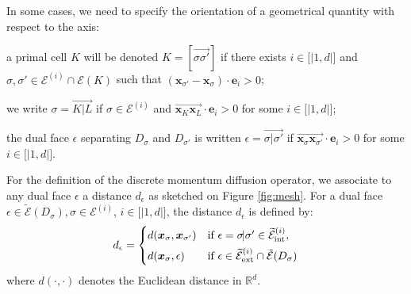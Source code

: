 \documentclass{amsart}
\numberwithin{equation}{section}
\begin{document}
\medskip
In some cases, we need to specify the orientation of a geometrical quantity with respect to the axis:
\begin{list}{-}{\itemsep=0.ex \topsep=0.5ex    }
\item a primal cell $K$ will be denoted $K = [\overrightarrow{{{\sigma}} {{\sigma}}'}]$ if 
there exists $i\in{[ \! \!\vert } 1, d{\vert \! \! ]}$ and ${{\sigma}}, {{\sigma}}' \in {\mathcal {E}^{(i)}} \cap {{\mathcal E}}(K)$
such that $({{\boldsymbol x}}_{{{\sigma}}'} - {{\boldsymbol x}}_{{\sigma}}) \cdot {{\boldsymbol e}}_i >0$;
\item we write ${{\sigma}} =\overrightarrow{K \vert L}$ if  ${{\sigma}} \in{\mathcal {E}^{(i)}}$ and $\overrightarrow{{{\boldsymbol x}}_{K}\!{{\boldsymbol x}}_{L}}\cdot {{\boldsymbol e}}_{i}>0$ for some $i \in {[ \! \!\vert } 1,d {\vert \! \! ]}$;
\item the dual face ${\epsilon}$ separating $D_{{\sigma}}$ and $D_{{{\sigma}}'}$ is written ${\epsilon} = \overrightarrow{{{\sigma}}\!\vert{{{\sigma}}'}}$ if $\overrightarrow{{{\boldsymbol x}}_{{\sigma}}\!{{\boldsymbol x}}_{{{\sigma}}'}}\cdot {{\boldsymbol e}}_{i}>0$ for some $i \in{[ \! \!\vert } 1, d{\vert \! \! ]}$.
\end{list}

\medskip
For the definition of the discrete momentum diffusion operator, we associate to any dual face ${\epsilon}$ a distance $d_{\epsilon}$ as sketched on Figure \ref{fig:mesh}. 
For a dual face ${\epsilon} \in {\widetilde {{\mathcal E}}}(D_{{\sigma}}), {{\sigma}} \in {\mathcal {E}^{(i)}}$, $i \in {{[ \! \!\vert } 1, d{\vert \! \! ]}}$, the distance $d_{\epsilon}$ is defined by:
 \begin{align}
  d_{\epsilon} =  \begin{cases}
    d({{\boldsymbol x}}_{{\sigma}},{{\boldsymbol x}}_{{{\sigma}}'}) & \mbox{if} \  {\epsilon} = {{\sigma}}\! \vert{{\sigma}}'\in {{{\widetilde {{\mathcal E}}}^{(i)}_{{\rm int}}}},\\[1ex]
    d({{\boldsymbol x}}_{{\sigma}},{\epsilon}) & \mbox{if} \ {\epsilon} \in {{{\widetilde {{\mathcal E}}}^{(i)}_{{\rm ext}}}} \cap \tilde{{\mathcal E}}(D_{{\sigma}})
  \end{cases}
  \label{depsilon}
 \end{align}
where $d(\cdot,\cdot)$ denotes the Euclidean distance in ${\mathbb{R}}^d$. 
\end{document}
